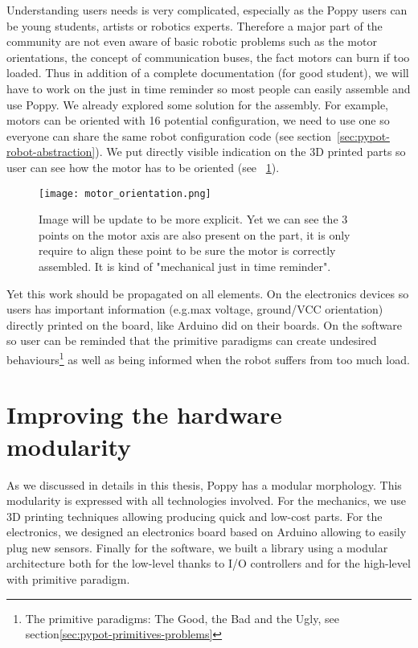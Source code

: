 Understanding users needs is very complicated, especially as the Poppy users can be young students, artists or robotics experts. Therefore a major part of the community are not even aware of basic robotic problems such as the motor orientations, the concept of communication buses, the fact motors can burn if too loaded. Thus in addition of a complete documentation (for good student), we will have to work on the just in time reminder so most people can easily assemble and use Poppy.
We already explored some solution for the assembly. For example, motors can be oriented with 16 potential configuration, we need to use one so everyone can share the same robot configuration code (see section~\ref{sec:pypot-robot-abstraction}). We put directly visible indication on the 3D printed parts so user can see how the motor has to be oriented (see \figurename~\ref{fig:motor_orientation}).
\begin{figure}[tb]
    \centering
        \texttt{[image: motor\_orientation.png]}
    \caption{Image will be update to be more explicit. Yet we can see the 3 points on the motor axis are also present on the part, it is only require to align these point to be sure the motor is correctly assembled. It is kind of "mechanical just in time reminder".}
    \label{fig:motor_orientation}
\end{figure}

Yet this work should be propagated on all elements. On the electronics devices so users has important information (e.g.max voltage, ground/VCC orientation) directly printed on the board, like Arduino did on their boards. On the software so user can be reminded that the primitive paradigms can create undesired behaviours\footnote{The primitive paradigms: The Good, the Bad and the Ugly, see section\ref{sec:pypot-primitives-problems}} as well as being informed when the robot suffers from too much load.


\section{Improving the hardware modularity} %
\label{sec:improve-hardware-modularity}

As we discussed in details in this thesis, Poppy has a modular morphology. This modularity is expressed with all technologies involved. For the mechanics, we use 3D printing techniques allowing producing quick and low-cost parts. For the electronics, we designed an electronics board based on Arduino allowing to easily plug new sensors. Finally for the software, we built a library using a modular architecture both for the low-level thanks to I/O controllers and for the high-level with primitive paradigm.

